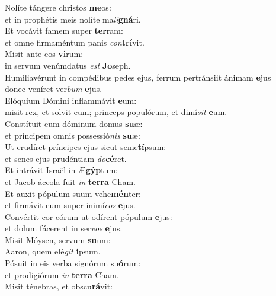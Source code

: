 \oddverse Nolíte tángere christos \textbf{me}os:~\*\\
\oddverse et in prophétis meis nolíte ma\textit{li}\textbf{gná}ri.\\
\evenverse Et vocávit famem super \textbf{ter}ram:~\*\\
\evenverse et omne firmaméntum panis \textit{con}\textbf{trí}vit.\\
\oddverse Misit ante eos \textbf{vi}rum:~\*\\
\oddverse in servum venúmdatus \textit{est} \textbf{Jo}seph.\\
\evenverse Humiliavérunt in compédibus pedes ejus, ferrum pertránsiit ánimam \textbf{e}jus~\*\\
\evenverse donec veníret ver\textit{bum} \textbf{e}jus.\\
\oddverse Elóquium Dómini inflammávit \textbf{e}um:~\*\\
\oddverse misit rex, et solvit eum; princeps populórum, et dimí\textit{sit} \textbf{e}um.\\
\evenverse Constítuit eum dóminum domus \textbf{su}æ:~\*\\
\evenverse et príncipem omnis possessió\textit{nis} \textbf{su}æ:\\
\oddverse Ut erudíret príncipes ejus sicut seme\textbf{tí}psum:~\*\\
\oddverse et senes ejus prudéntiam \textit{do}\textbf{cé}ret.\\
\evenverse Et intrávit Israël in Æ\textbf{gýp}tum:~\*\\
\evenverse et Jacob áccola fuit \textit{in} \textbf{ter}\textbf{ra} Cham.\\
\oddverse Et auxit pópulum suum vehe\textbf{mén}ter:~\*\\
\oddverse et firmávit eum super inimí\textit{cos} \textbf{e}jus.\\
\evenverse Convértit cor eórum ut odírent pópulum \textbf{e}jus:~\*\\
\evenverse et dolum fácerent in ser\textit{vos} \textbf{e}jus.\\
\oddverse Misit Móysen, servum \textbf{su}um:~\*\\
\oddverse Aaron, quem elé\textit{git} \textbf{i}psum.\\
\evenverse Pósuit in eis verba signórum su\textbf{ó}rum:~\*\\
\evenverse et prodigiórum \textit{in} \textbf{ter}\textbf{ra} Cham.\\
\oddverse Misit ténebras, et obscu\textbf{rá}vit:~\*\\
